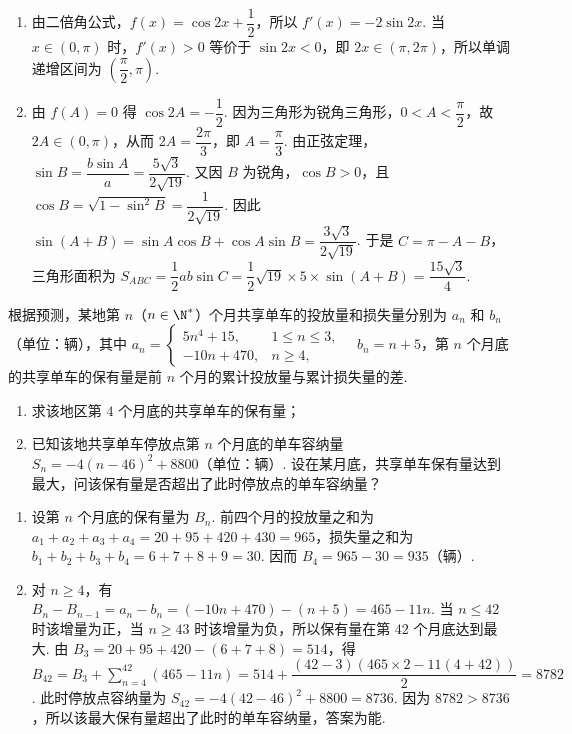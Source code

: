 \begin{solution}
\begin{enumerate}
\item 由二倍角公式，\(f(x)=\cos2x+\dfrac12\)，所以 \(f'(x)=-2\sin2x\). 当 \(x\in(0,\pi)\) 时，\(f'(x)>0\) 等价于 \(\sin2x<0\)，即 \(2x\in(\pi,2\pi)\)，所以单调递增区间为 \(\left(\dfrac\pi2,\pi\right)\).
\item 由 \(f(A)=0\) 得 \(\cos2A=-\dfrac12\). 因为三角形为锐角三角形，\(0<A<\dfrac\pi2\)，故 \(2A\in(0,\pi)\)，从而 \(2A=\dfrac{2\pi}{3}\)，即 \(A=\dfrac\pi3\). 由正弦定理，\(\sin B=\dfrac{b\sin A}{a}=\dfrac{5\sqrt3}{2\sqrt{19}}\). 又因 \(B\) 为锐角，\(\cos B>0\)，且 \(\cos B=\sqrt{1-\sin^2B}=\dfrac1{2\sqrt{19}}\). 因此 \(\sin(A+B)=\sin A\cos B+\cos A\sin B=\dfrac{3\sqrt3}{2\sqrt{19}}\). 于是 \(C=\pi-A-B\)，三角形面积为
\(S_{ABC}=\dfrac12ab\sin C=\dfrac12\sqrt{19}\times5\times\sin(A+B)=\dfrac{15\sqrt3}{4}\).
\end{enumerate}
\end{solution}

\begin{problem}
根据预测，某地第 \(n\)（\(n\in\N^*\)）个月共享单车的投放量和损失量分别为 \(a_n\) 和 \(b_n\)（单位：辆），其中
\(a_n=\begin{cases}
5n^4+15,&1\le n\le 3,\\
-10n+470,&n\ge4,
\end{cases}\quad b_n=n+5\)，第 \(n\) 个月底的共享单车的保有量是前 \(n\) 个月的累计投放量与累计损失量的差.

\begin{enumerate}
\item 求该地区第 \(4\) 个月底的共享单车的保有量；
\item 已知该地共享单车停放点第 \(n\) 个月底的单车容纳量 \(S_n=-4(n-46)^2+8800\)（单位：辆）. 设在某月底，共享单车保有量达到最大，问该保有量是否超出了此时停放点的单车容纳量？
\end{enumerate}
\end{problem}

\begin{solution}
\begin{enumerate}
\item 设第 \(n\) 个月底的保有量为 \(B_n\). 前四个月的投放量之和为 \(a_1+a_2+a_3+a_4=20+95+420+430=965\)，损失量之和为 \(b_1+b_2+b_3+b_4=6+7+8+9=30\). 因而 \(B_4=965-30=935\)（辆）.
\item 对 \(n\ge4\)，有 \(B_n-B_{n-1}=a_n-b_n=(-10n+470)-(n+5)=465-11n\). 当 \(n\le42\) 时该增量为正，当 \(n\ge43\) 时该增量为负，所以保有量在第 \(42\) 个月底达到最大. 由 \(B_3=20+95+420-(6+7+8)=514\)，得
\(B_{42}=B_3+\sum_{n=4}^{42}(465-11n)=514+\dfrac{(42-3)(465\times2-11(4+42))}{2}=8782\). 此时停放点容纳量为 \(S_{42}=-4(42-46)^2+8800=8736\). 因为 \(8782>8736\)，所以该最大保有量超出了此时的单车容纳量，答案为能.
\end{enumerate}
\end{solution}


